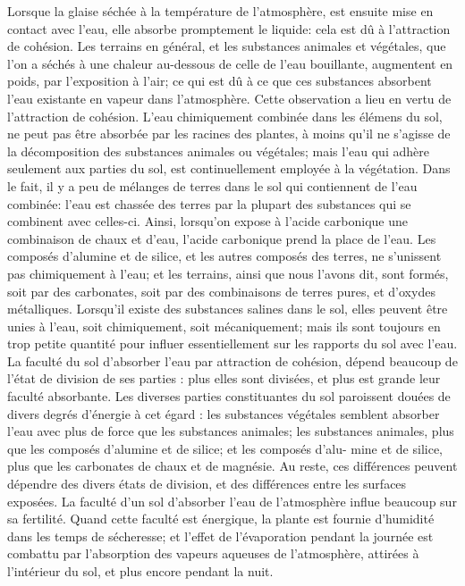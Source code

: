 Lorsque la glaise séchée à la température de l'atmosphère, est ensuite mise en contact avec l'eau, elle absorbe promptement le liquide: cela est dû à l'attraction de cohésion. Les terrains en général, et les substances animales et végétales, que l'on a séchés à une chaleur au-dessous de celle de l'eau bouillante, augmentent en poids, par l'exposition à l'air; ce qui est dû à ce que ces substances absorbent l'eau existante en vapeur dans l'atmosphère. Cette observation a lieu en vertu de l'attraction de cohésion.
L'eau chimiquement combinée dans les élémens du sol, ne peut pas être absorbée par les racines des plantes, à moins qu'il ne s'agisse de la décomposition des substances animales ou végétales; mais l'eau qui adhère seulement aux parties du sol, est continuellement employée à la végétation. Dans le\setcounter{page}{447} fait, il y a peu de mélanges de terres dans le sol qui contiennent de l'eau combinée: l'eau est chassée des terres par la plupart des substances qui se combinent avec celles-ci. Ainsi, lorsqu'on expose à l'acide carbonique une combinaison de chaux et d'eau, l'acide carbonique prend la place de l'eau. Les composés d'alumine et de silice, et les autres composés des terres, ne s'unissent pas chimiquement à l'eau; et les terrains, ainsi que nous l'avons dit, sont formés, soit par des carbonates, soit par des combinaisons de terres pures, et d'oxydes métalliques.
Lorsqu'il existe des substances salines dans le sol, elles peuvent être unies à l'eau, soit chimiquement, soit mécaniquement; mais ils sont toujours en trop petite quantité pour influer essentiellement sur les rapports du sol avec l'eau.
La faculté du sol d'absorber l'eau par attraction de cohésion, dépend beaucoup de l'état de division de ses parties : plus elles sont divisées, et plus est grande leur faculté absorbante. Les diverses parties constituantes du sol paroissent douées de divers degrés d'énergie à cet égard : les substances végétales semblent absorber l'eau avec plus de force que les substances animales; les substances animales, plus que les composés d'alumine et de silice; et les composés d'alu-\setcounter{page}{448} mine et de silice, plus que les carbonates de chaux et de magnésie. Au reste, ces différences peuvent dépendre des divers états de division, et des différences entre les surfaces exposées.
La faculté d'un sol d'absorber l'eau de l'atmosphère influe beaucoup sur sa fertilité. Quand cette faculté est énergique, la plante est fournie d'humidité dans les temps de sécheresse; et l'effet de l'évaporation pendant la journée est combattu par l'absorption des vapeurs aqueuses de l'atmosphère, attirées à l'intérieur du sol, et plus encore pendant la nuit.
